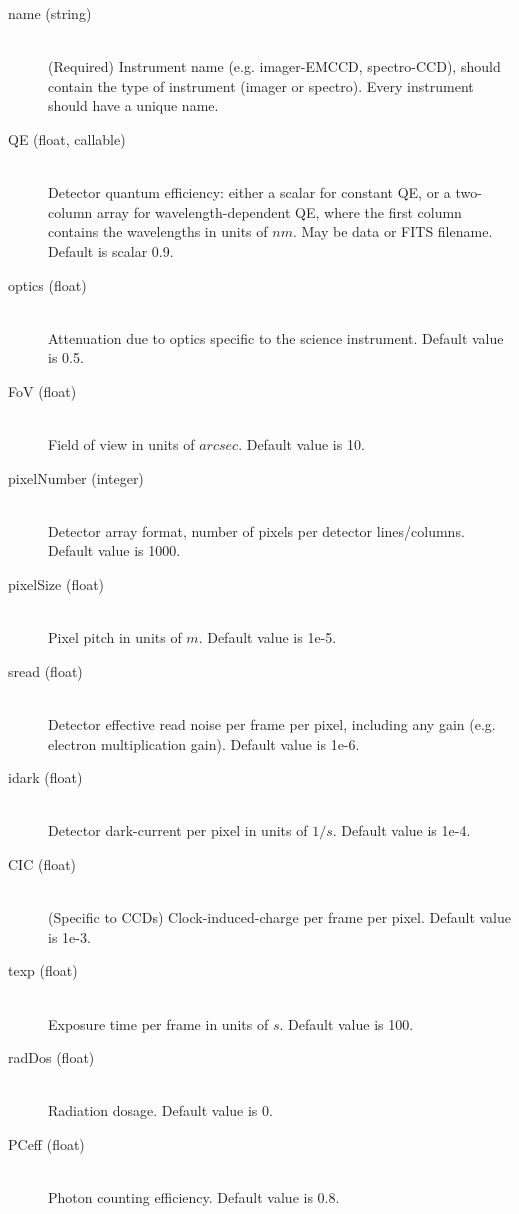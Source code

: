 \documentclass[cleanfoot]{asme2ej}
\begin{document}
\begin{itemize}
\begin{description}
    \begin{description}
        \item[name (string)] \hfill\\ (Required) Instrument name (e.g. imager-EMCCD, spectro-CCD), should contain the type of instrument (imager or spectro). Every instrument should have a unique name.
        \item[QE (float, callable)] \hfill \\ Detector quantum efficiency: either a scalar for constant QE, or a two-column array for wavelength-dependent QE, where the first column contains the wavelengths in units of $ nm $. May be data or FITS filename. Default is scalar 0.9. 
        \item[optics (float)] \hfill \\ Attenuation due to optics specific to the science instrument. Default value is 0.5.
        \item[FoV (float)] \hfill \\ Field of view in units of $ arcsec $. Default value is 10.
        \item[pixelNumber (integer)] \hfill \\ Detector array format, number of pixels per detector lines/columns. Default value is 1000.
        \item[pixelSize (float)] \hfill \\ Pixel pitch in units of $ m $. Default value is 1e-5. 
        \item[sread (float)] \hfill \\ Detector effective read noise per frame per pixel, including any gain (e.g. electron multiplication gain). Default value is 1e-6.
        \item[idark (float)] \hfill \\ Detector dark-current per pixel in units of $ 1/s $. Default value is 1e-4. 
        \item[CIC (float)] \hfill \\ (Specific to CCDs) Clock-induced-charge per frame per pixel. Default value is 1e-3. 
        \item[texp (float)] \hfill \\ Exposure time per frame in units of $ s $. Default value is 100. 
        \item[radDos (float)] \hfill \\ Radiation dosage. Default value is 0.
        \item[PCeff (float)] \hfill \\ Photon counting efficiency. Default value is 0.8.

\end{description}
\end{description}
\end{itemize}
\end{document}
